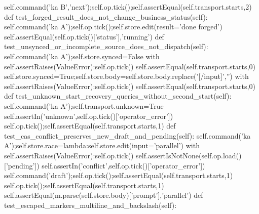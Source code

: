         self.command('ka B','next');self.op.tick();self.assertEqual(self.transport.starts,2)
    def test_forged_result_does_not_change_business_status(self):
        self.command('ka A');self.op.tick();self.store.edit(result='done forged\n')
        self.assertEqual(self.op.tick()['status'],'running')
    def test_unsynced_or_incomplete_source_does_not_dispatch(self):
        self.command('ka A');self.store.synced=False
        with self.assertRaises(ValueError):self.op.tick()
        self.assertEqual(self.transport.starts,0)
        self.store.synced=True;self.store.body=self.store.body.replace('[/input]','')
        with self.assertRaises(ValueError):self.op.tick()
        self.assertEqual(self.transport.starts,0)
    def test_unknown_start_recovery_queries_without_second_start(self):
        self.command('ka A');self.transport.unknown=True
        self.assertIn('unknown',self.op.tick()['operator_error'])
        self.op.tick();self.assertEqual(self.transport.starts,1)
    def test_cas_conflict_preserves_new_draft_and_pending(self):
        self.command('ka A');self.store.race=lambda:self.store.edit(input='parallel\n')
        with self.assertRaises(ValueError):self.op.tick()
        self.assertIsNotNone(self.op.load()['pending'])
        self.assertIn('conflict',self.op.tick()['operator_error'])
        self.command('draft');self.op.tick();self.assertEqual(self.transport.starts,1)
        self.op.tick();self.assertEqual(self.transport.starts,1)
        self.assertEqual(m.parse(self.store.body)['prompt'],'parallel')
    def test_escaped_markers_multiline_and_backslash(self):
